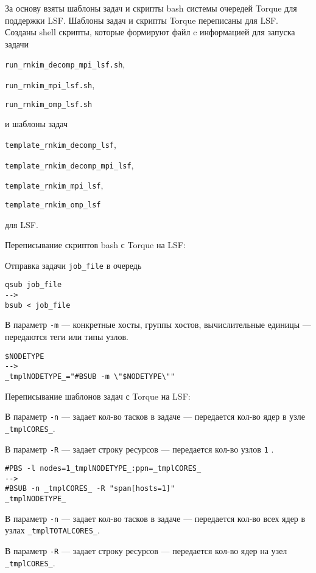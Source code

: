 За основу взяты шаблоны задач и скрипты bash системы очередей Torque для поддержки LSF. Шаблоны задач и скрипты Torque переписаны для LSF. Созданы shell скрипты, которые формируют файл c информацией для запуска задачи

\lstinline{run_rnkim_decomp_mpi_lsf.sh},

\lstinline{run_rnkim_mpi_lsf.sh},

\lstinline{run_rnkim_omp_lsf.sh}

и шаблоны задач

\lstinline{template_rnkim_decomp_lsf},

\lstinline{template_rnkim_decomp_mpi_lsf},

\lstinline{template_rnkim_mpi_lsf},

\lstinline{template_rnkim_omp_lsf}

для LSF.

Переписывание скриптов bash с Torque на LSF:

Отправка задачи \lstinline{job_file} в очередь 

\begin{lstlisting}
qsub job_file
-->
bsub < job_file
\end{lstlisting}

В параметр \lstinline{-m} --- конкретные хосты, группы хостов, вычислительные единицы --- передаются теги или типы узлов.

\begin{lstlisting}
$NODETYPE
-->
_tmplNODETYPE_="#BSUB -m \"$NODETYPE\""
\end{lstlisting}

Переписывание шаблонов задач с Torque на LSF:

В параметр \lstinline{-n} --- задает кол-во тасков в задаче --- передается кол-во ядер в узле \lstinline{_tmplCORES_}.

В параметр \lstinline{-R} --- задает строку ресурсов --- передается кол-во узлов \lstinline{1} \cite{ref_bsub}.
\begin{lstlisting}
#PBS -l nodes=1_tmplNODETYPE_:ppn=_tmplCORES_
-->
#BSUB -n _tmplCORES_ -R "span[hosts=1]"
_tmplNODETYPE_
\end{lstlisting}

В параметр \lstinline{-n} --- задает кол-во тасков в задаче --- передается кол-во всех ядер в узлах \lstinline{_tmplTOTALCORES_}.

В параметр \lstinline{-R} --- задает строку ресурсов --- передается кол-во ядер на узел \lstinline{_tmplCORES_}.


